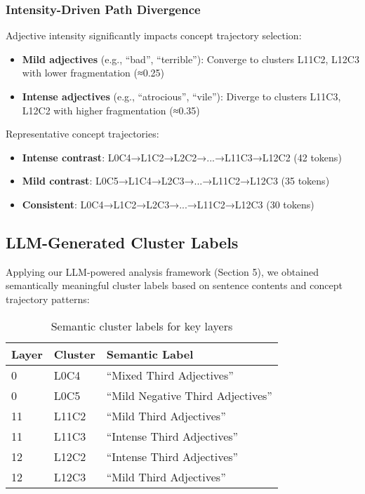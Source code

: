 \subsubsection{Intensity-Driven Path Divergence}

Adjective intensity significantly impacts concept trajectory selection:

\begin{itemize}
    \item \textbf{Mild adjectives} (e.g., ``bad'', ``terrible''): Converge to clusters L11C2, L12C3 with lower fragmentation (≈0.25)
    \item \textbf{Intense adjectives} (e.g., ``atrocious'', ``vile''): Diverge to clusters L11C3, L12C2 with higher fragmentation (≈0.35)
\end{itemize}

Representative concept trajectories:
\begin{itemize}
    \item \textbf{Intense contrast}: L0C4→L1C2→L2C2→...→L11C3→L12C2 (42 tokens)
    \item \textbf{Mild contrast}: L0C5→L1C4→L2C3→...→L11C2→L12C3 (35 tokens)  
    \item \textbf{Consistent}: L0C4→L1C2→L2C3→...→L11C2→L12C3 (30 tokens)
\end{itemize}

\subsection{LLM-Generated Cluster Labels}

Applying our LLM-powered analysis framework (Section 5), we obtained semantically meaningful cluster labels based on sentence contents and concept trajectory patterns:

\begin{table}[h!]
\centering
\caption{Semantic cluster labels for key layers}
\label{tab:gpt2_cluster_labels}
\begin{tabular}{lll}
\toprule
Layer & Cluster & Semantic Label \\
\midrule
0 & L0C4 & ``Mixed Third Adjectives'' \\
0 & L0C5 & ``Mild Negative Third Adjectives'' \\
11 & L11C2 & ``Mild Third Adjectives'' \\  
11 & L11C3 & ``Intense Third Adjectives'' \\
12 & L12C2 & ``Intense Third Adjectives'' \\
12 & L12C3 & ``Mild Third Adjectives'' \\
\bottomrule
\end{tabular}
\end{table}

